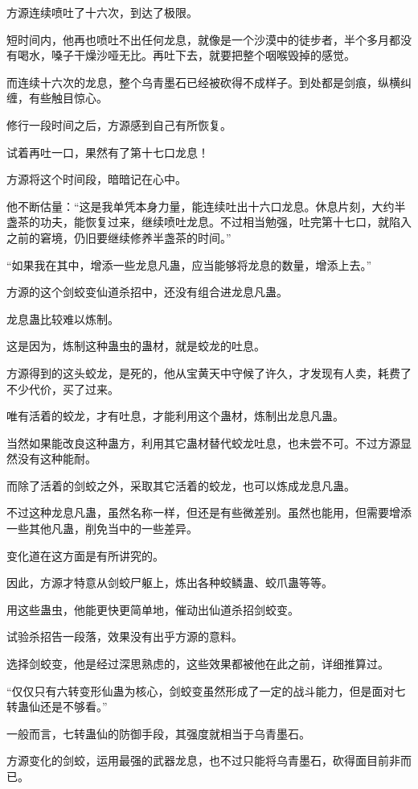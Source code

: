 \begin{this_body}
方源连续喷吐了十六次，到达了极限。

短时间内，他再也喷吐不出任何龙息，就像是一个沙漠中的徒步者，半个多月都没有喝水，嗓子干燥沙哑无比。再吐下去，就要把整个咽喉毁掉的感觉。

而连续十六次的龙息，整个乌青墨石已经被砍得不成样子。到处都是剑痕，纵横纠缠，有些触目惊心。

修行一段时间之后，方源感到自己有所恢复。

试着再吐一口，果然有了第十七口龙息！

方源将这个时间段，暗暗记在心中。

他不断估量：“这是我单凭本身力量，能连续吐出十六口龙息。休息片刻，大约半盏茶的功夫，能恢复过来，继续喷吐龙息。不过相当勉强，吐完第十七口，就陷入之前的窘境，仍旧要继续修养半盏茶的时间。”

“如果我在其中，增添一些龙息凡蛊，应当能够将龙息的数量，增添上去。”

方源的这个剑蛟变仙道杀招中，还没有组合进龙息凡蛊。

龙息蛊比较难以炼制。

这是因为，炼制这种蛊虫的蛊材，就是蛟龙的吐息。

方源得到的这头蛟龙，是死的，他从宝黄天中守候了许久，才发现有人卖，耗费了不少代价，买了过来。

唯有活着的蛟龙，才有吐息，才能利用这个蛊材，炼制出龙息凡蛊。

当然如果能改良这种蛊方，利用其它蛊材替代蛟龙吐息，也未尝不可。不过方源显然没有这种能耐。

而除了活着的剑蛟之外，采取其它活着的蛟龙，也可以炼成龙息凡蛊。

不过这种龙息凡蛊，虽然名称一样，但还是有些微差别。虽然也能用，但需要增添一些其他凡蛊，削免当中的一些差异。

变化道在这方面是有所讲究的。

因此，方源才特意从剑蛟尸躯上，炼出各种蛟鳞蛊、蛟爪蛊等等。

用这些蛊虫，他能更快更简单地，催动出仙道杀招剑蛟变。

试验杀招告一段落，效果没有出乎方源的意料。

选择剑蛟变，他是经过深思熟虑的，这些效果都被他在此之前，详细推算过。

“仅仅只有六转变形仙蛊为核心，剑蛟变虽然形成了一定的战斗能力，但是面对七转蛊仙还是不够看。”

一般而言，七转蛊仙的防御手段，其强度就相当于乌青墨石。

方源变化的剑蛟，运用最强的武器龙息，也不过只能将乌青墨石，砍得面目前非而已。


\end{this_body}
